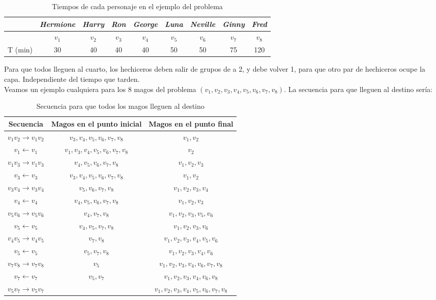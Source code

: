\documentclass[letterpaper,10pt,table, dvipsnames]{article}
\begin{document}
\begin{table}[htbp]
  \centering
  \caption{Tiempos de cada personaje en el ejemplo del problema}
    \begin{tabular}{|c|c|c|c|c|c|c|c|c|}
    \hline
          & \textit{Hermione}& \textit{Harry} & \textit{Ron} & \textit{George} & \textit{Luna} & \textit{Neville} & \textit{Ginny} & \textit{Fred} \bigstrut\\
    \hline
          & $v_1 $ & $v_2 $ & $v_3 $ & $v_4 $  & $v_5 $ & $v_6 $ & $v_7 $ & $v_8 $ \bigstrut\\
    \hline
    T (min) & 30    & 40    & 40    & 40    & 50    & 50    & 75    & 120 \bigstrut\\
    \hline
    \end{tabular}%
  \label{tab:tiempos}%
\end{table}%

Para que todos lleguen al cuarto, los hechiceros deben salir de grupos de a 2, y debe volver 1, para que otro par de hechiceros ocupe la capa. Independiente del tiempo que tarden.\\

Veamos un ejemplo cualquiera para los 8 magos del problema $(v_1,v_2,v_3,v_4,v_5,v_6,v_7,v_8)$. La secuencia para que lleguen al destino sería:
\begin{table}[htbp]
  \centering
  \caption{Secuencia para que todos los magos lleguen al destino}
\begin{tabular}{|c||c||c|}\hline
Secuencia & Magos en el punto inicial & Magos en el punto final \\\hline 
    $v_1v_2 \rightarrow v_1v_2$ & $v_3,v_4,v_5,v_6,v_7,v_8$ & $v_1,v_2$ \\\hline
  $  v_1 \leftarrow v_1$ & $v_1,v_3,v_4,v_5,v_6,v_7,v_8$ & $v_2$ \\\hline
    $v_1v_3 \rightarrow v_1v_3$ & $v_4,v_5,v_6,v_7,v_8$ & $v_1,v_2,v_3$ \\\hline
  $  v_3 \leftarrow v_3 $ & $v_3,v_4,v_5,v_6,v_7,v_8$ & $v_1,v_2$ \\\hline
    $v_3v_4 \rightarrow v_3v_4$ & $v_5,v_6,v_7,v_8$ & $v_1,v_2,v_3,v_4$ \\\hline
  $  v_4 \leftarrow v_4 $ & $v_4,v_5,v_6,v_7,v_8$ & $v_1,v_2,v_3$ \\\hline
    $v_5v_6 \rightarrow v_5v_6$ & $v_4,v_7,v_8$ & $v_1,v_2,v_3,v_5,v_6$ \\\hline
  $  v_5 \leftarrow v_5 $ & $v_4,v_5,v_7,v_8$ & $v_1,v_2,v_3,v_6$ \\\hline
    $v_4v_5 \rightarrow v_4v_5$ & $v_7,v_8$ & $v_1,v_2,v_3,v_4,v_5,v_6$ \\\hline
  $  v_5 \leftarrow v_5 $ & $v_5,v_7,v_8$ & $v_1,v_2,v_3,v_4,v_6$ \\\hline
    $v_7v_8 \rightarrow v_7v_8$ & $v_5$ & $v_1,v_2,v_3,v_4,v_6,v_7,v_8$ \\\hline
  $  v_7 \leftarrow v_7 $ & $v_5,v_7$ & $v_1,v_2,v_3,v_4,v_6,v_8$ \\\hline
    $v_5v_7 \rightarrow v_5v_7$ &  & $v_1,v_2,v_3,v_4,v_5,v_6,v_7,v_8$ \\\hline
\end{tabular}
\label{tab:secuencia}
\end{table}
\end{document}
